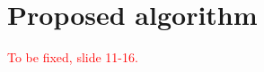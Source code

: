 \documentclass[11pt]{article}
\newcommand\myworries[1]{\textcolor{red}{#1}}
\begin{document}
%

\section{Proposed algorithm}\label{algorithm}

\myworries{To be fixed, slide 11-16.}
\end{document}
